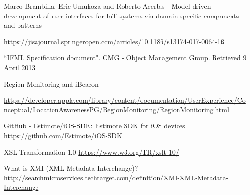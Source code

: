 

\begin{thebibliography}{90}

Marco Brambilla, Eric Umuhoza and Roberto Acerbis - Model-driven development of user interfaces for IoT systems via domain-specific components and patterns

\url{https://jisajournal.springeropen.com/articles/10.1186/s13174-017-0064-1ß}
    
``IFML Specification document". OMG - Object Management Group. Retrieved 9 April 2013.

Region Monitoring and iBeacon

\url{https://developer.apple.com/library/content/documentation/UserExperience/Conceptual/LocationAwarenessPG/RegionMonitoring/RegionMonitoring.html}
    
GitHub - Estimote/iOS-SDK: Estimote SDK for iOS devices
\url{https://github.com/Estimote/iOS-SDK}

XSL Transformation 1.0 
\url{https://www.w3.org/TR/xslt-10/}

What is XMI (XML Metadata Interchange)?
\url{http://searchmicroservices.techtarget.com/definition/XMI-XML-Metadata-Interchange}

\end{thebibliography}


